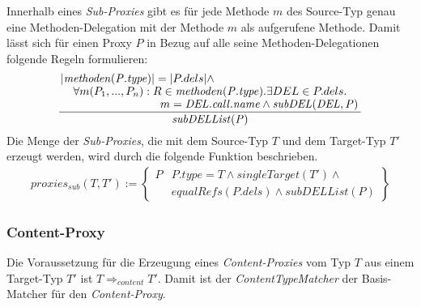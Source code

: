 \documentclass[a4paper,12pt]{article}
\begin{document}
Innerhalb eines \emph{Sub-Proxies} gibt es für jede Methode $m$ des Source-Typ genau eine Methoden-Delegation mit der Methode $m$ als aufgerufene Methode. Damit lässt sich für einen Proxy $P$ in Bezug auf alle seine Methoden-Delegationen folgende Regeln formulieren:
\begin{gather*}
\frac{\splitfrac{|\mathit{methoden(P.type)}| = |P.dels| \wedge}{ \splitfrac{\forall m(P_1,...,P_n):R \in \mathit{methoden(P.type)}.\exists DEL \in P.dels.}{m = \mathit{DEL.call.name} \wedge \mathit{subDEL(DEL,P)}
 }}
}
{\mathit{subDELList(P)}}
\end{gather*}
Die Menge der \emph{Sub-Proxies}, die mit dem Source-Typ $T$ und dem Target-Typ $T'$ erzeugt werden, wird durch die folgende Funktion beschrieben.
\begin{gather*}
\mathit{proxies_{sub}(T,T')} := 
\left\{\begin{array}{l|l}
	P	& P.type = T \wedge  \mathit{singleTarget(T')} \wedge \mathit{ }\\
		& \mathit{equalRefs(P.dels)} \wedge \mathit{subDELList(P)}
		 \end{array}
\right\}
\end{gather*}


\subsubsection{Content-Proxy}
Die Voraussetzung für die Erzeugung eines \emph{Content-Proxies} vom Typ $T$ aus einem Target-Typ $T'$ ist $T \Rightarrow_{content} T'$. Damit ist der \emph{ContentTypeMatcher} der Basis-Matcher für den \emph{Content-Proxy}.
\end{document}
